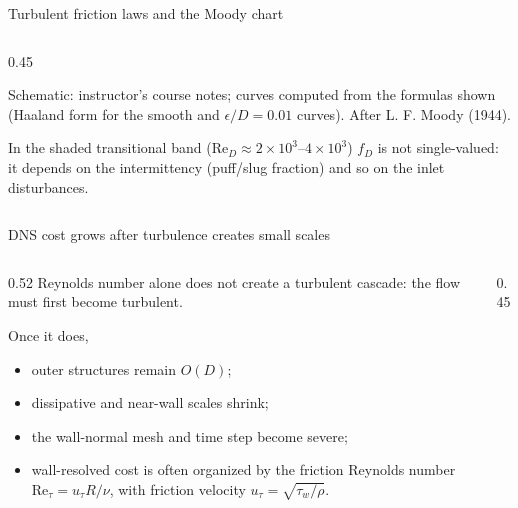 \documentclass[aspectratio=169,11pt]{beamer}
\newcommand{\Rey}{\mathrm{Re}}
\begin{document}
\begin{frame}{Turbulent friction laws and the Moody chart}
\begin{columns}[T,onlytextwidth]
\begin{column}{0.45\textwidth}
{\tiny\color{DarkGray} Schematic: instructor's course notes; curves computed from the formulas shown (Haaland form for the smooth and $\epsilon/D=0.01$ curves). After L. F. Moody (1944).\par}

\vspace{0.3em}
{\scriptsize\raggedright In the shaded transitional band ($\Rey_D\approx2\times10^3$--$4\times10^3$) $f_D$ is not single-valued: it depends on the intermittency (puff/slug fraction) and so on the inlet disturbances.\par}
\end{column}
\end{columns}
\end{frame}

\begin{frame}{DNS cost grows after turbulence creates small scales}
\begin{columns}[T,onlytextwidth]
\begin{column}{0.52\textwidth}
Reynolds number alone does not create a turbulent cascade: the flow must first become turbulent.

Once it does,
\begin{itemize}\itemsep4pt
  \item outer structures remain $O(D)$;
  \item dissipative and near-wall scales shrink;
  \item the wall-normal mesh and time step become severe;
  \item wall-resolved cost is often organized by the friction Reynolds number $\Rey_\tau=u_\tau R/\nu$, with friction velocity $u_\tau=\sqrt{\tau_w/\rho}$.
\end{itemize}
\end{column}
\begin{column}{0.45\textwidth}
\centering
{}
\end{column}
\end{columns}
\end{frame}
\end{document}
